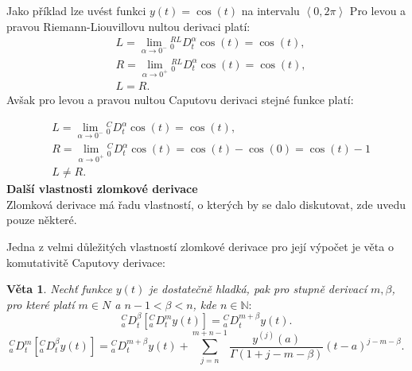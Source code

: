 \documentclass[a4paper,12pt,twoside]{article}
\newtheorem{veta}{Věta}[section]
\theoremstyle{definition}
\theoremstyle{remark}
\numberwithin{equation}{section}
\numberwithin{table}{section}
\numberwithin{figure}{section}
\newcommand{\N}{\mathbb{N}}
\begin{document}
Jako příklad lze uvést funkci $y\left(t\right) =  \cos{\left(t\right)}$ na intervalu $\left\langle 0, 2\pi \right\rangle$ Pro levou a pravou Riemann-Liouvillovu nultou derivaci platí:%
\begin{align}
	&L = \lim\limits_{\alpha \to 0^{-}} {_{0}^{RL}D^{\alpha}_{t}} \cos{\left(t\right)} = \cos{\left(t\right)}, \\
	&R = \lim\limits_{\alpha \to {0}^{+}} {_{0}^{RL}D^{\alpha}_{t}} \cos{\left(t\right)} = \cos{\left(t\right)}, \\
	&L = R.
\end{align}
Avšak pro levou a pravou nultou Caputovu derivaci stejné funkce platí:

\begin{align}
	&L = \lim\limits_{\alpha \to 0^{-}} {_{0}^{C}D^{\alpha}_{t}} \cos{\left(t\right)} = \cos{\left(t\right)}, \\
	&R = \lim\limits_{\alpha \to {0}^{+}} {_{0}^{C}D^{\alpha}_{t}} \cos{\left(t\right)} = \cos{\left(t\right)}  - \cos{\left(0\right)} = \cos{\left(t\right)} - 1 \\
	&L \neq R.
\end{align}
\textbf{Další vlastnosti zlomkové derivace}\\
Zlomková derivace má řadu vlastností, o kterých by se dalo diskutovat, zde uvedu pouze některé.

Jedna z velmi důležitých vlastností zlomkové derivace pro její výpočet je věta o komutativitě Caputovy derivace:

\begin{veta} \label{CaputovaKomutativita}
	Nechť funkce $y\left(t\right)$ je dostatečně hladká, pak pro stupně derivací $m, \beta$, pro které platí $m \in N$ a $n-1 < \beta < n$, kde $n \in \N:$	
	$$
		{_{a}^{C}D^{\beta}_{t}} \left[  {_{a}^{C}D^{m}_{t}} y\left(t\right)\right] = {_{a}^{C}D^{m + \beta}_{t}} y\left(t\right).
	$$
	$$
		{_{a}^{C}D^{m}_{t}} \left[  {_{a}^{C}D^{\beta}_{t}} y\left(t\right)\right] = {_{a}^{C}D^{m + \beta}_{t}} y\left(t\right) + \sum_{j=n}^{m+n-1} \frac{y^{\left(j\right)}\left(a\right)}{\Gamma \left(1+j-m- \beta\right)} \left(t-a\right)^{j-m-\beta}.
	$$
\end{veta}
\end{document}
